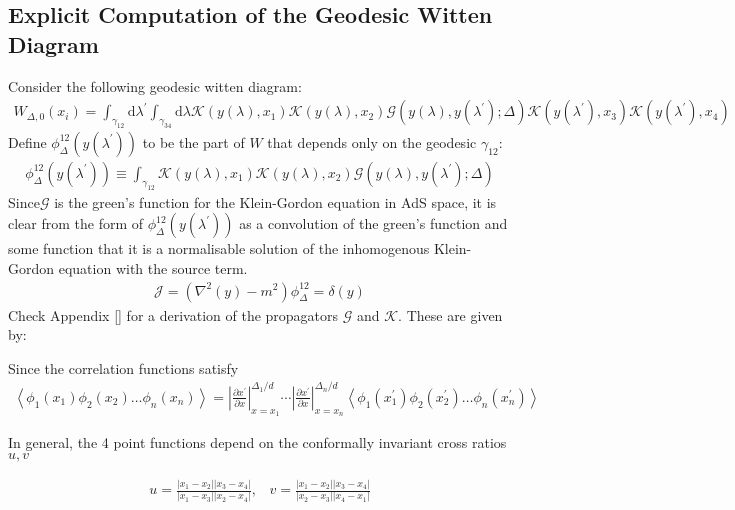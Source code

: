    \subsection{Explicit Computation of the Geodesic Witten Diagram}
   Consider the following geodesic witten diagram:
   \begin{align}
    W_{\Delta,0}(x_i)=\int_{\gamma_{12}} \mathrm{d}\lambda^\prime \int_{\gamma_{34}} \mathrm{d}\lambda \mathcal{K}(y(\lambda),x_1) \mathcal{K}(y(\lambda),x_2) \mathcal{G}(y(\lambda),y(\lambda^\prime);\Delta)\mathcal{K}(y(\lambda^\prime),x_3) \mathcal{K}(y(\lambda^\prime),x_4) \label{eqw}
   \end{align}
  Define $\phi_{\Delta}^{12}(y(\lambda^\prime))$ to be the part of $W$ that depends only on the geodesic $\gamma_{12}$: 
  \begin{align}
   \phi_{\Delta}^{12}(y(\lambda^\prime))\equiv  \int_{\gamma_{12}} \mathcal{K}(y(\lambda),x_1) \mathcal{K}(y(\lambda),x_2) \mathcal{G}(y(\lambda),y(\lambda^\prime);\Delta) \label{eqphi}
  \end{align}
  Since$\mathcal{G}$ is the green's function for the Klein-Gordon equation in AdS space, it is clear from the form of $\phi_{\Delta}^{12}(y(\lambda^\prime))$ as a convolution of the green's function and some function that it is a normalisable solution of the inhomogenous Klein-Gordon equation with the source term.
  \begin{align*}
   \mathcal{J}=(\nabla^2(y)-m^2)\phi_{\Delta}^{12} = \delta(y) %
  \end{align*}
  Check Appendix [] for a derivation of the propagators $\mathcal{G}$ and $\mathcal{K}$. These are given by:
  
  Since the correlation functions satisfy
  \begin{align*}
   \left\langle \phi_1(x_1) \phi_2(x_2) \dots \phi_n(x_n) \right\rangle = \left| \frac{\partial x^\prime}{\partial x}\right|_{x=x_1}^{\Delta_1/d} \cdots \left| \frac{\partial x^\prime}{\partial x}\right|_{x=x_n}^{\Delta_n/d} \left\langle \phi_1(x_1^\prime) \phi_2(x_2^\prime) \dots \phi_n(x_n^\prime) \right\rangle
  \end{align*}
  
  In general, the 4 point functions depend on the conformally invariant cross ratios $u,v$
  
  \begin{align}
   u=\frac{|x_1-x_2||x_3-x_4|}{|x_1-x_3||x_2-x_4|}, \;\;\; v = \frac{|x_1-x_2||x_3-x_4|}{|x_2-x_3||x_4-x_1|}
  \end{align}

